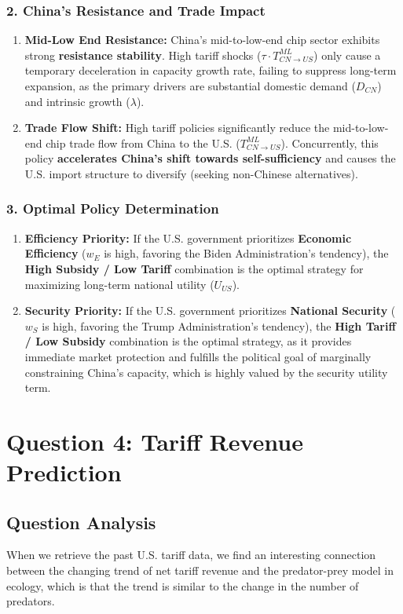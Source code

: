 \documentclass[12pt]{article}
\begin{document}
\subsubsection{2. China's Resistance and Trade Impact}
\begin{enumerate}
    \item \textbf{Mid-Low End Resistance:} China's mid-to-low-end chip sector exhibits strong \textbf{resistance stability}. High tariff shocks ($\tau \cdot T_{CN \to US}^{ML}$) only cause a temporary deceleration in capacity growth rate, failing to suppress long-term expansion, as the primary drivers are substantial domestic demand ($D_{CN}$) and intrinsic growth ($\lambda$).
    \item \textbf{Trade Flow Shift:} High tariff policies significantly reduce the mid-to-low-end chip trade flow from China to the U.S. ($T_{CN \to US}^{ML}$). Concurrently, this policy \textbf{accelerates China's shift towards self-sufficiency} and causes the U.S. import structure to diversify (seeking non-Chinese alternatives).
\end{enumerate}

\subsubsection{3. Optimal Policy Determination}
\begin{enumerate}
    \item \textbf{Efficiency Priority:} If the U.S. government prioritizes \textbf{Economic Efficiency} ($w_E$ is high, favoring the Biden Administration's tendency), the \textbf{High Subsidy / Low Tariff} combination is the optimal strategy for maximizing long-term national utility ($U_{US}$).
    \item \textbf{Security Priority:} If the U.S. government prioritizes \textbf{National Security} ($w_S$ is high, favoring the Trump Administration's tendency), the \textbf{High Tariff / Low Subsidy} combination is the optimal strategy, as it provides immediate market protection and fulfills the political goal of marginally constraining China's capacity, which is highly valued by the security utility term.
\end{enumerate}

\section{Question 4: Tariff Revenue Prediction}

\subsection{Question Analysis}
When we retrieve the past U.S. tariff data, we find an interesting connection between the changing trend of net tariff revenue and the predator-prey model in ecology, which is that the trend is similar to the change in the number of predators.
\end{document}
